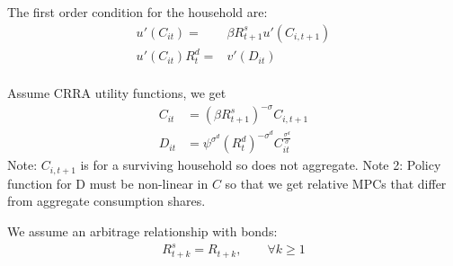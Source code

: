\documentclass[11pt]{article}
\begin{document}


The first order condition for the household are:
%
\begin{align*}
	u'(C_{it})=&\beta  R_{t+1}^s u'(C_{i,t+1}) \\
    u'(C_{it})R_{t}^d=&v'(D_{it}) \\
\end{align*}

Assume CRRA utility functions, we get
\begin{align*}
	C_{it} &= (\beta R_{t+1}^s)^{-\sigma}C_{i,t+1} \\
    D_{it} &= \psi^{\sigma^d}(R_{t}^d)^{-\sigma^d}C_{it}^{\frac{\sigma^d}{\sigma}} 
\end{align*}
Note: $C_{i,t+1}$ is for a surviving household so does not aggregate.
Note 2: Policy function for D must be non-linear in $C$ so that we get
relative MPCs that differ from aggregate consumption shares.

We assume an arbitrage relationship with bonds:
\begin{align*}
    R_{t+k}^s = R_{t+k},\qquad \forall k\ge 1
\end{align*}

\end{document}
